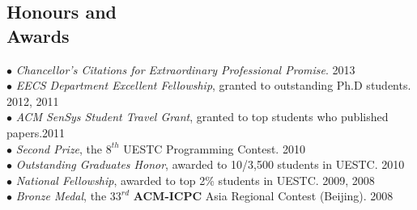 \documentclass[margin, centered]{resume}
\begin{document}
\begin{resume}


    \section{\mysidestyle Honours and\\Awards} 

    $\bullet$ \textsl{Chancellor's Citations for Extraordinary Professional Promise}. \hfill 2013 \\
    $\bullet$ \textsl{EECS Department Excellent Fellowship}, granted to outstanding Ph.D students. \hfill 2012, 2011\vspace{0mm}\\%
    $\bullet$ \textsl{ACM SenSys Student Travel Grant}, granted to top students who published papers.\hfill 2011\vspace{0mm}\\%
    $\bullet$ \textsl{Second Prize}, the $8^{th}$ UESTC Programming Contest. \hfill 2010\vspace{0mm}\\%
    $\bullet$ \textsl{Outstanding Graduates Honor}, awarded to 10/3,500 students in UESTC. \hfill 2010\vspace{0mm}\\%
    $\bullet$ \textsl{National Fellowship}, awarded to top 2\% students in UESTC. \hfill 2009, 2008\vspace{0mm}\\%
    $\bullet$ \textsl{Bronze Medal}, the $33^{rd}$ \textbf{ACM-ICPC} Asia Regional Contest (Beijing). \hfill 2008\vspace{-5mm}\\ 



\end{resume}
\end{document}
